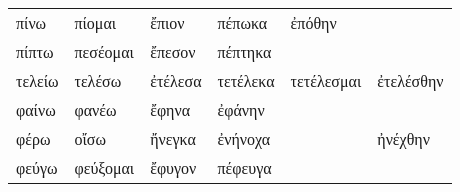 \begin{small}
{\begin{tabular}{llllll}
πίνω  &  πίομαι  &  ἔπιον  &  πέπωκα  &  ἐπόθην        \\
πίπτω  &  πεσέομαι  &  ἔπεσον  &  πέπτηκα        \\
τελείω  &  τελέσω  &  ἐτέλεσα  &  τετέλεκα  &  τετέλεσμαι  &  ἐτελέσθην        \\
φαίνω  &  φανέω  &  ἔφηνα  &  ἐφάνην        \\
φέρω  &  οἴσω  &  ἤνεγκα  &  ἐνήνοχα  &    &  ἠνέχθην        \\
φεύγω  &  φεύξομαι  &  ἔφυγον  &  πέφευγα        \\
\end{tabular}

}

\end{small}

\pagebreak
